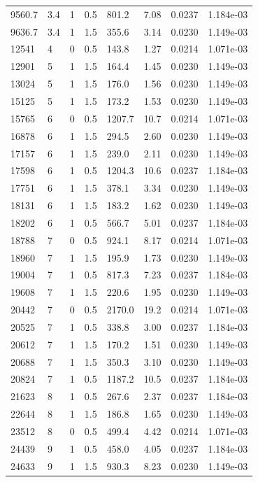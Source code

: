 \documentclass[preview]{standalone}
\begin{document}
{{\begin{tabular}{L{1.2cm}C{1.2cm} C{0.3cm}C{0.5cm} C{1.4cm}C{1.4cm} C{1.4cm}C{1.4cm}}
  9560.7  &   3.4  & 1     & 0.5 &  801.2  & 7.08  & 0.0237 &  1.184e-03   \\ 
  9636.7  &   3.4  & 1     & 1.5 &  355.6  & 3.14  & 0.0230 &  1.149e-03   \\ 
  12541  &     4  & 0     & 0.5 &  143.8  & 1.27  & 0.0214 &  1.071e-03   \\ 
  12901  &     5  & 1     & 1.5 &  164.4  & 1.45  & 0.0230 &  1.149e-03   \\ 
  13024  &     5  & 1     & 1.5 &  176.0  & 1.56  & 0.0230 &  1.149e-03   \\ 
  15125  &     5  & 1     & 1.5 &  173.2  & 1.53  & 0.0230 &  1.149e-03   \\ 
  15765  &     6  & 0     & 0.5 &  1207.7  & 10.7  & 0.0214 &  1.071e-03   \\ 
  16878  &     6  & 1     & 1.5 &  294.5  & 2.60  & 0.0230 &  1.149e-03   \\ 
  17157  &     6  & 1     & 1.5 &  239.0  & 2.11  & 0.0230 &  1.149e-03   \\ 
  17598  &     6  & 1     & 0.5 &  1204.3  & 10.6  & 0.0237 &  1.184e-03   \\ 
  17751  &     6  & 1     & 1.5 &  378.1  & 3.34  & 0.0230 &  1.149e-03   \\ 
  18131  &     6  & 1     & 1.5 &  183.2  & 1.62  & 0.0230 &  1.149e-03   \\ 
  18202  &     6  & 1     & 0.5 &  566.7  & 5.01  & 0.0237 &  1.184e-03   \\ 
  18788  &     7  & 0     & 0.5 &  924.1  & 8.17  & 0.0214 &  1.071e-03   \\ 
  18960  &     7  & 1     & 1.5 &  195.9  & 1.73  & 0.0230 &  1.149e-03   \\ 
  19004  &     7  & 1     & 0.5 &  817.3  & 7.23  & 0.0237 &  1.184e-03   \\ 
  19608  &     7  & 1     & 1.5 &  220.6  & 1.95  & 0.0230 &  1.149e-03   \\ 
  20442  &     7  & 0     & 0.5 &  2170.0  & 19.2  & 0.0214 &  1.071e-03   \\ 
  20525  &     7  & 1     & 0.5 &  338.8  & 3.00  & 0.0237 &  1.184e-03   \\ 
  20612  &     7  & 1     & 1.5 &  170.2  & 1.51  & 0.0230 &  1.149e-03   \\ 
  20688  &     7  & 1     & 1.5 &  350.3  & 3.10  & 0.0230 &  1.149e-03   \\ 
  20824  &     7  & 1     & 0.5 &  1187.2  & 10.5  & 0.0237 &  1.184e-03   \\ 
  21623  &     8  & 1     & 0.5 &  267.6  & 2.37  & 0.0237 &  1.184e-03   \\ 
  22644  &     8  & 1     & 1.5 &  186.8  & 1.65  & 0.0230 &  1.149e-03   \\ 
  23512  &     8  & 0     & 0.5 &  499.4  & 4.42  & 0.0214 &  1.071e-03   \\ 
  24439  &     9  & 1     & 0.5 &  458.0  & 4.05  & 0.0237 &  1.184e-03   \\ 
  24633  &     9  & 1     & 1.5 &  930.3  & 8.23  & 0.0230 &  1.149e-03   \\ 
\hline 
\end{tabular} 

}}
\end{document}
